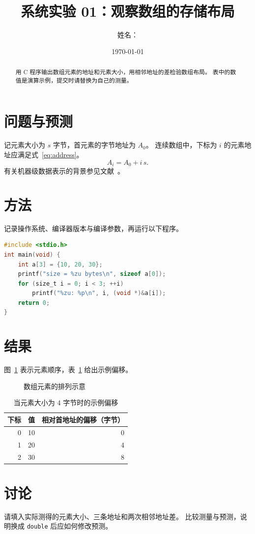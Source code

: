 \documentclass[UTF8,fontset=fandol,a4paper,12pt]{ctexart}
\title{系统实验 01：观察数组的存储布局}
\author{姓名：\underline{\hspace{3cm}}}
\date{\today}
\begin{document}
\maketitle
\begin{abstract}
用 C 程序输出数组元素的地址和元素大小，用相邻地址的差检验数组布局。
表中的数值是演算示例，提交时请替换为自己的测量。
\end{abstract}
\section{问题与预测}
记元素大小为 $s$ 字节，首元素的字节地址为 $A_0$。
连续数组中，下标为 $i$ 的元素地址应满足式~\eqref{eq:address}。
\begin{equation}\label{eq:address}
  A_i=A_0+i\,s .
\end{equation}
有关机器级数据表示的背景参见文献~\cite{csapp3}。
\section{方法}
记录操作系统、编译器版本与编译参数，再运行以下程序。
\begin{lstlisting}[language=C,basicstyle=\ttfamily\small,frame=single]
#include <stdio.h>
int main(void) {
    int a[3] = {10, 20, 30};
    printf("size = %zu bytes\n", sizeof a[0]);
    for (size_t i = 0; i < 3; ++i)
        printf("%zu: %p\n", i, (void *)&a[i]);
    return 0;
}
\end{lstlisting}
\section{结果}
图~\ref{fig:array} 表示元素顺序，表~\ref{tab:offset} 给出示例偏移。
\begin{figure}[htbp]
  \centering
  \caption{数组元素的排列示意}\label{fig:array}
\end{figure}
\begin{table}[htbp]
  \centering
  \caption{当元素大小为 4 字节时的示例偏移}\label{tab:offset}
  \begin{tabular}{rrr}
    \toprule
    下标 & 值 & 相对首地址的偏移（字节）\\
    \midrule
    0 & 10 & 0\\
    1 & 20 & 4\\
    2 & 30 & 8\\
    \bottomrule
  \end{tabular}
\end{table}
\section{讨论}
请填入实际测得的元素大小、三条地址和两次相邻地址差。
比较测量与预测，说明换成 \texttt{double} 后应如何修改预测。
\printbibliography[title={参考文献}]
\end{document}
